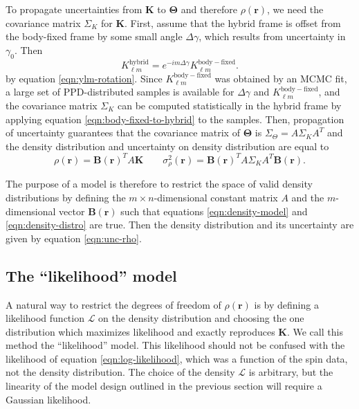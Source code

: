 \documentclass[fleqn,usenatbib]{mnras}
\begin{document}
To propagate uncertainties from $\bm K$ to $\bm \Theta$ and therefore $\rho(\bm r)$, we need the covariance matrix $\Sigma_K$ for $\bm K$. First, assume that the hybrid frame is offset from the body-fixed frame by some small angle $\Delta \gamma$, which results from uncertainty in $\gamma_0$. Then
\begin{equation}
  K_{\ell m}^\mathrm{hybrid} = e^{-im\Delta \gamma}K_{\ell m}^\mathrm{body-fixed}.
  \label{eqn:body-fixed-to-hybrid}
\end{equation}
by equation \ref{eqn:ylm-rotation}. Since $K_{\ell m}^\mathrm{body-fixed}$ was obtained by an MCMC fit, a large set of PPD-distributed samples is available for $\Delta \gamma$ and $K_{\ell m}^\mathrm{body-fixed}$, and the covariance matrix $\Sigma_K$ can be computed statistically in the hybrid frame by applying equation \ref{eqn:body-fixed-to-hybrid} to the samples. Then, propagation of uncertainty guarantees that the covariance matrix of $\bm \Theta$ is $\Sigma_\Theta = A \Sigma_K A^T$ and the density distribution and uncertainty on density distribution are equal to
\begin{equation}
  \rho(\bm r) = \bm B(\bm r)^T A\bm K \qquad \sigma^2_\rho(\bm r) = \bm B(\bm r)^T A \Sigma_K A^T \bm B(\bm r).
  \label{eqn:unc-rho}
\end{equation}

The purpose of a model is therefore to restrict the space of valid density distributions by defining the $m\times n$-dimensional constant matrix $A$ and the $m$-dimensional vector $\bm B(\bm r)$ such that equations \ref{eqn:density-model} and \ref{eqn:density-distro} are true. Then the density distribution and its uncertainty are given by equation \ref{eqn:unc-rho}.



\subsection{The ``likelihood'' model}
\label{sec:likelihood}

A natural way to restrict the degrees of freedom of $\rho(\bm r)$ is by defining a likelihood function $\mathcal{L}$ on the density distribution and choosing the one distribution which maximizes likelihood and exactly reproduces $\bm K$. We call this method the ``likelihood'' model. This likelihood should not be confused with the likelihood of equation \ref{eqn:log-likelihood}, which was a function of the spin data, not the density distribution. The choice of the density $\mathcal{L}$ is arbitrary, but the linearity of the model design outlined in the previous section will require a Gaussian likelihood.
\end{document}
